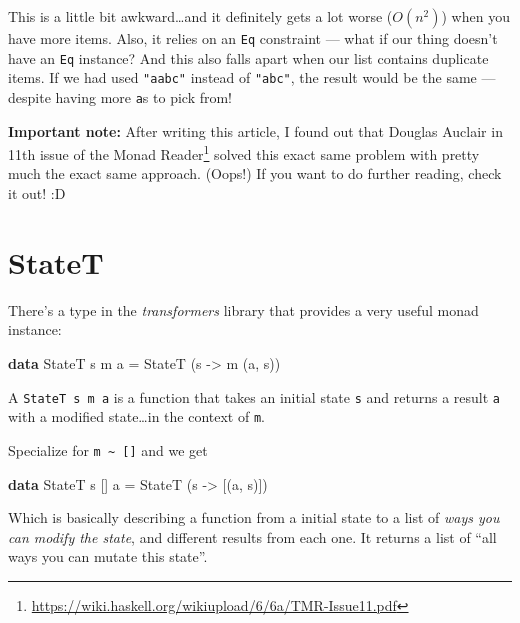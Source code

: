 \documentclass[]{article}
\newenvironment{Shaded}{}{}
\newcommand{\KeywordTok}[1]{\textcolor[rgb]{0.00,0.44,0.13}{\textbf{{#1}}}}
\newcommand{\DataTypeTok}[1]{\textcolor[rgb]{0.56,0.13,0.00}{{#1}}}
\newcommand{\OtherTok}[1]{\textcolor[rgb]{0.00,0.44,0.13}{{#1}}}
\newcommand{\FunctionTok}[1]{\textcolor[rgb]{0.02,0.16,0.49}{{#1}}}
\newcommand{\NormalTok}[1]{{#1}}
\renewcommand{\href}[2]{#2\footnote{\url{#1}}}
\begin{document}
This is a little bit awkward\ldots{}and it definitely gets a lot worse
(\(O(n^2)\)) when you have more items. Also, it relies on an \texttt{Eq}
constraint --- what if our thing doesn't have an \texttt{Eq} instance? And this
also falls apart when our list contains duplicate items. If we had used
\texttt{"aabc"} instead of \texttt{"abc"}, the result would be the same ---
despite having more \texttt{\textquotesingle{}a\textquotesingle{}}s to pick
from!

\textbf{Important note:} After writing this article, I found out that Douglas
Auclair in \href{https://wiki.haskell.org/wikiupload/6/6a/TMR-Issue11.pdf}{11th
issue of the Monad Reader} solved this exact same problem with pretty much the
exact same approach. (Oops!) If you want to do further reading, check it out! :D

\section{StateT}\label{statet}

There's a type in the \emph{transformers} library that provides a very useful
monad instance:

\begin{Shaded}
\begin{Highlighting}[]
\KeywordTok{data} \DataTypeTok{StateT} \NormalTok{s m a }\FunctionTok{=} \DataTypeTok{StateT} \NormalTok{(s }\OtherTok{->} \NormalTok{m (a, s))}
\end{Highlighting}
\end{Shaded}

A \texttt{StateT\ s\ m\ a} is a function that takes an initial state \texttt{s}
and returns a result \texttt{a} with a modified state\ldots{}in the context of
\texttt{m}.

Specialize for \texttt{m\ \textasciitilde{}\ {[}{]}} and we get

\begin{Shaded}
\begin{Highlighting}[]
\KeywordTok{data} \DataTypeTok{StateT} \NormalTok{s [] a }\FunctionTok{=} \DataTypeTok{StateT} \NormalTok{(s }\OtherTok{->} \NormalTok{[(a, s)])}
\end{Highlighting}
\end{Shaded}

Which is basically describing a function from a initial state to a list of
\emph{ways you can modify the state}, and different results from each one. It
returns a list of ``all ways you can mutate this state''.
\end{document}
